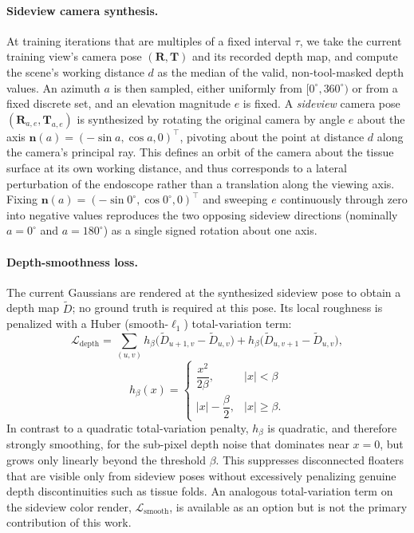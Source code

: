 \paragraph{Sideview camera synthesis.}
At training iterations that are multiples of a fixed interval $\tau$, we
take the current training view's camera pose $(\mathbf{R}, \mathbf{T})$
and its recorded depth map, and compute the scene's working distance $d$
as the median of the valid, non-tool-masked depth values. An azimuth $a$
is then sampled, either uniformly from $[0^\circ, 360^\circ)$ or from a
fixed discrete set, and an elevation magnitude $e$ is fixed. A
\emph{sideview} camera pose $(\mathbf{R}_{a,e}, \mathbf{T}_{a,e})$ is
synthesized by rotating the original camera by angle $e$ about the axis
$\mathbf{n}(a) = (-\sin a, \cos a, 0)^\top$, pivoting about the point at
distance $d$ along the camera's principal ray. This defines an orbit of
the camera about the tissue surface at its own working distance, and thus
corresponds to a lateral perturbation of the endoscope rather than a
translation along the viewing axis. Fixing $\mathbf{n}(a) = (-\sin
0^\circ, \cos 0^\circ, 0)^\top$ and sweeping $e$ continuously through zero
into negative values reproduces the two opposing sideview directions
(nominally $a = 0^\circ$ and $a = 180^\circ$) as a single signed rotation
about one axis.

\paragraph{Depth-smoothness loss.}
The current Gaussians are rendered at the synthesized sideview pose to
obtain a depth map $\tilde{D}$; no ground truth is required at this pose.
Its local roughness is penalized with a Huber (smooth-$\ell_1$)
total-variation term:
\begin{equation}
\mathcal{L}_{\mathrm{depth}} = \sum_{(u,v)} h_\beta\!\big(\tilde{D}_{u+1,v} - \tilde{D}_{u,v}\big) + h_\beta\!\big(\tilde{D}_{u,v+1} - \tilde{D}_{u,v}\big),
\label{eq:gcsr-depth}
\end{equation}
\begin{equation}
h_\beta(x) = \begin{cases} \dfrac{x^2}{2\beta}, & |x| < \beta \\[4pt] |x| - \dfrac{\beta}{2}, & |x| \ge \beta. \end{cases}
\end{equation}
In contrast to a quadratic total-variation penalty, $h_\beta$ is quadratic,
and therefore strongly smoothing, for the sub-pixel depth noise that
dominates near $x = 0$, but grows only linearly beyond the threshold
$\beta$. This suppresses disconnected floaters that are visible only from
sideview poses without excessively penalizing genuine depth
discontinuities such as tissue folds. An analogous total-variation term on
the sideview color render, $\mathcal{L}_{\mathrm{smooth}}$, is available as
an option but is not the primary contribution of this work.

